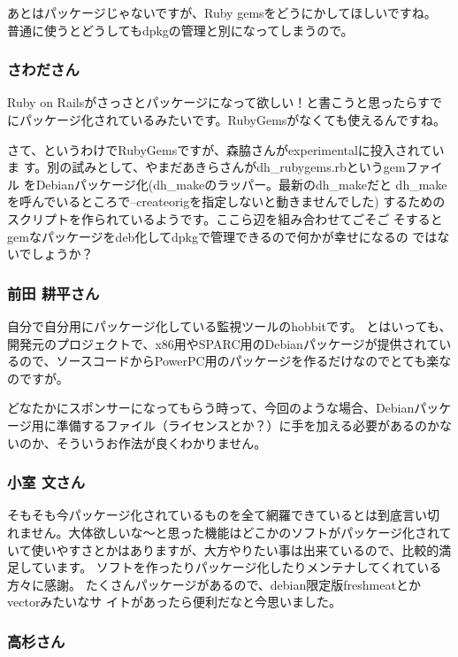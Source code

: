 \documentclass[mingoth,a4paper]{jsarticle}
\begin{document}
あとはパッケージじゃないですが、Ruby gemsをどうにかしてほしいですね。
普通に使うとどうしてもdpkgの管理と別になってしまうので。


\subsubsection{さわださん}

Ruby on Railsがさっさとパッケージになって欲しい！と書こうと思ったらすでにパッケージ化されているみたいです。RubyGemsがなくても使えるんですね。

さて、というわけでRubyGemsですが、森脇さんがexperimentalに投入されていま
す。別の試みとして、やまだあきらさんがdh\_{}rubygems.rbというgemファイル
をDebianパッケージ化(dh\_{}makeのラッパー。最新のdh\_{}makeだと
dh\_{}makeを呼んでいるところで--createorigを指定しないと動きませんでした)
するためのスクリプトを作られているようです。ここら辺を組み合わせてごそご
そするとgemなパッケージをdeb化してdpkgで管理できるので何かが幸せになるの
ではないでしょうか？

\subsubsection{前田 耕平さん}

自分で自分用にパッケージ化している監視ツールのhobbitです。
とはいっても、開発元のプロジェクトで、x86用やSPARC用のDebianパッケージが提供されているので、ソースコードからPowerPC用のパッケージを作るだけなのでとても楽なのですが。

どなたかにスポンサーになってもらう時って、今回のような場合、Debianパッケージ用に準備するファイル（ライセンスとか？）に手を加える必要があるのかないのか、そういうお作法が良くわかりません。

\subsubsection{小室 文さん}

そもそも今パッケージ化されているものを全て網羅できているとは到底言い切
れません。大体欲しいな〜と思った機能はどこかのソフトがパッケージ化されて
いて使いやすさとかはありますが、大方やりたい事は出来ているので、比較的満
足しています。
ソフトを作ったりパッケージ化したりメンテナしてくれている方々に感謝。
たくさんパッケージがあるので、debian限定版freshmeatとかvectorみたいなサ
イトがあったら便利だなと今思いました。

\subsubsection{高杉さん}
\end{document}
